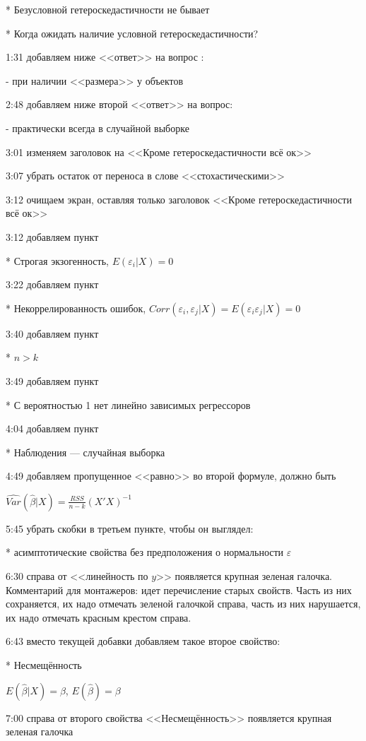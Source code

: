 \documentclass[12pt,a4paper]{article}
\newcommand{\e}{\varepsilon}
\renewcommand{\b}{\beta}
\newcommand{\hb}{\hat{\b}}
\begin{document}
* Безусловной гетероскедастичности не бывает

* Когда ожидать наличие условной гетероскедастичности?

1:31 добавляем ниже <<ответ>> на вопрос :

- при наличии <<размера>> у объектов

2:48 добавляем ниже второй <<ответ>> на вопрос:

- практически всегда в случайной выборке


3:01 изменяем заголовок на <<Кроме гетероскедастичности всё ок>>

3:07 убрать остаток от переноса в слове <<стохастическими>>

3:12 очищаем экран, оставляя только заголовок <<Кроме гетероскедастичности всё ок>>

3:12 добавляем пункт

* Строгая экзогенность, $E(\e_i|X)=0$

3:22 добавляем пункт

* Некоррелированность ошибок, $Corr(\e_i,\e_j|X)=E(\e_i \e_j|X)=0$

3:40 добавляем пункт

* $n>k$

3:49 добавляем пункт 

* С вероятностью 1 нет линейно зависимых регрессоров

4:04 добавляем пункт

* Наблюдения --- случайная выборка

4:49 добавляем пропущенное <<равно>> во второй формуле, должно быть

$\widehat{Var}(\hb|X)=\frac{RSS}{n-k}(X'X)^{-1}$

5:45 убрать скобки в третьем пункте, чтобы он выглядел:

* асимптотические свойства без предположения о нормальности $\e$

6:30 справа от <<линейность по $y$>> появляется крупная зеленая галочка. Комментарий для монтажеров: идет перечисление старых свойств. Часть из них сохраняется, их надо отмечать зеленой галочкой справа, часть из них нарушается, их надо отмечать красным крестом справа.

6:43 вместо текущей добавки добавляем такое второе свойство:

* Несмещённость

$E(\hb|X)=\beta$, $E(\hb)=\beta$

7:00 справа от второго свойства <<Несмещённость>> появляется крупная зеленая галочка
\end{document}
